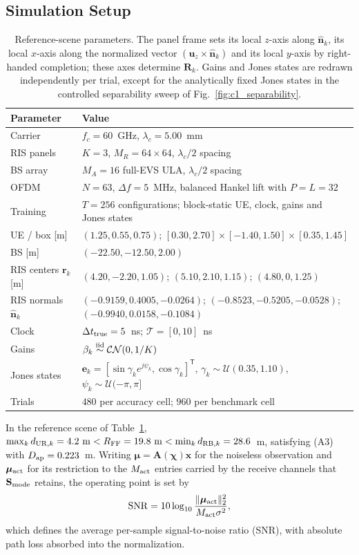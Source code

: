 \documentclass[letterpaper,journal]{IEEEtran}
\newcommand{\bx}{\mathbf{x}}
\newcommand{\be}{\mathbf{e}}
\newcommand{\bn}{\mathbf{n}}
\newcommand{\br}{\mathbf{r}}
\newcommand{\bu}{\mathbf{u}}
\newcommand{\bA}{\mathbf{A}}
\newcommand{\bR}{\mathbf{R}}
\newcommand{\bS}{\mathbf{S}}
\newcommand{\bmu}{\boldsymbol{\mu}}
\newcommand{\bchi}{\boldsymbol{\chi}}
\begin{document}
\subsection{Simulation Setup}
\label{subsec:res_setup}
\begin{table}[!t]
\caption{Reference-scene parameters. The panel frame sets its local $z$-axis
along $\hat{\bn}_k$, its local $x$-axis along the normalized vector
$(\bu_z\times\hat{\bn}_k)$ and its local $y$-axis by right-handed
completion; these axes determine $\bR_k$. Gains and Jones states are redrawn independently per trial,
except for the analytically fixed Jones states in the controlled separability
sweep of Fig.~\ref{fig:c1_separability}.}
\label{tab:params}
\centering
\scriptsize
\begin{tabular}{@{}l@{\quad}p{}@{}}
\toprule
Parameter & Value\\
\midrule
Carrier & $f_c=60$~GHz, $\lambda_c=5.00$~mm\\
RIS panels & $K=3$, $M_R=64\times64$, $\lambda_c/2$ spacing\\
BS array & $M_A=16$ full-EVS ULA, $\lambda_c/2$ spacing\\
OFDM & $N=63$, $\Delta f=5$~MHz, balanced Hankel lift with $P=L=32$\\
Training & $T=256$ configurations; block-static UE, clock, gains
and Jones states\\
UE / box [m] & $(1.25,0.55,0.75)$;
$[0.30,2.70]\!\times\![-1.40,1.50]\!\times\![0.35,1.45]$\\
BS [m] & $(-22.50,-12.50,2.00)$\\
RIS centers $\br_k$ [m] & $(4.20,-2.20,1.05)$; $(5.10,2.10,1.15)$;
$(4.80,0,1.25)$\\
RIS normals $\hat{\bn}_k$ & $(-0.9159,0.4005,-0.0264)$;
$(-0.8523,-0.5205,-0.0528)$; $(-0.9940,0.0158,-0.1084)$\\
Clock & $\Delta t_{\rm true}=5$~ns; $\mathcal T=[0,10]$~ns\\
Gains & $\beta_k\stackrel{\rm iid}{\sim}\mathcal{CN}(0,1/K)$\\
Jones states & $\be_k=[\sin\gamma_k e^{j\psi_k},\cos\gamma_k]^{\mathsf T}$,
$\gamma_k\!\sim\!\mathcal U(0.35,1.10)$,
$\psi_k\!\sim\!\mathcal U(-\pi,\pi]$\\
Trials & $480$ per accuracy cell; $960$ per benchmark cell\\
\bottomrule
\end{tabular}
\end{table}

In the reference scene of Table~\ref{tab:params},
$\max_k d_{{\rm UR},k}=4.2~{\rm m}<R_{\rm FF}=19.8~{\rm m}
<\min_k d_{{\rm RB},k}=28.6$~m, satisfying (A3) with
$D_{\rm ap}=0.223$~m. Writing $\bmu=\bA(\bchi)\bx$ for
the noiseless observation and $\bmu_{\rm act}$ for its restriction to the
$M_{\rm act}$ entries carried by the receive channels that
$\bS_{\rm mode}$ retains, the operating point is set by
\begin{equation}
	{\rm SNR}=10\log_{10}\frac{\|\bmu_{\rm act}\|_2^2}
	{M_{\rm act}\sigma^2},
	\label{eq:snrdef}
\end{equation}
which defines the average per-sample signal-to-noise ratio (SNR), with
absolute path loss absorbed into the normalization.
\end{document}
